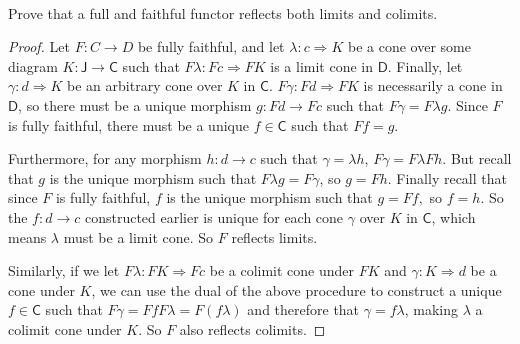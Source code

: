\documentclass[../../main]{subfiles}
\begin{document}
\paragraph{}
\begin{exercise}
Prove that a full and faithful functor reflects both limits and colimits.
\end{exercise}

\begin{proof}
Let $ F: C \to D $ be fully faithful, and let $ \lambda: c \Rightarrow K $ be a
cone over some diagram $ K: \mathsf{J} \to \mathsf{C} $ such that $ F\lambda: Fc
\Rightarrow FK $ is a limit cone in $ \mathsf{D} $. Finally, let $ \gamma: d
\Rightarrow K $ be an arbitrary cone over $ K $ in $ \mathsf{C} $. $ F\gamma: Fd
\Rightarrow FK $ is necessarily a cone in $ \mathsf{D} $, so there must be a
unique morphism $ g: Fd \to Fc $ such that $ F\gamma = F\lambda g $. Since $ F $
is fully faithful, there must be a unique $ f \in \mathsf{C} $ such that $ Ff =
g $.

Furthermore, for any morphism $ h: d \to c $ such that $ \gamma = \lambda h $, $
F\gamma = F\lambda Fh $. But recall that $ g $ is the unique morphism such that
$ F\lambda g = F\gamma $, so $ g = Fh $. Finally recall that since $ F $ is
fully faithful, $ f $ is the unique morphism such that $ g = Ff, $ so $ f = h. $
So the $ f: d \to c $ constructed earlier is unique for each cone $ \gamma $
over $ K $ in $ \mathsf{C} $, which means $ \lambda $ must be a limit cone. So $
F $ reflects limits.

Similarly, if we let $ F\lambda: FK \Rightarrow Fc $ be a colimit cone under $
FK $ and $ \gamma: K \Rightarrow d $ be a cone under $ K $, we can use the dual
of the above procedure to construct a unique $ f \in \mathsf{C} $ such that $
F\gamma = FfF\lambda = F(f\lambda) $ and therefore that $ \gamma = f\lambda $,
making $ \lambda $ a colimit cone under $ K $. So $ F $ also reflects colimits.
\end{proof}
\end{document}
